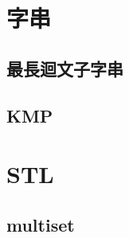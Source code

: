 %         
%         

\section{字串}
    \subsection{最長迴文子字串}
        
    \subsection{KMP}
        
\section{STL}
    \subsection{multiset}
        
